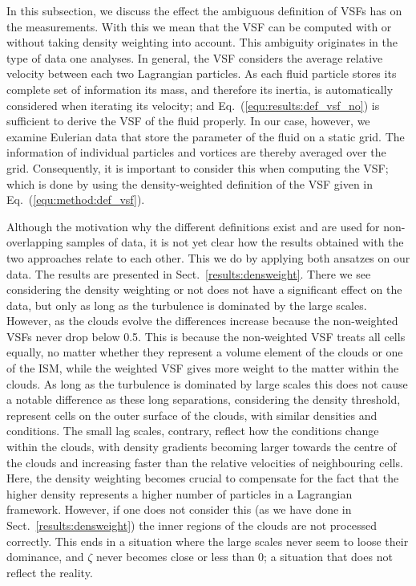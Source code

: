In this subsection, we discuss the effect the ambiguous definition of VSFs has on the measurements. 
With this we mean that the VSF can be computed with or without taking density weighting into account.
This ambiguity originates in the type of data one analyses.
In general, the VSF considers the average relative velocity between each two Lagrangian particles.
As each fluid particle stores its complete set of information its mass, and therefore its inertia, is automatically considered when iterating its velocity; and Eq.~(\ref{equ:results:def_vsf_no}) is sufficient to derive the VSF of the fluid properly.
In our case, however, we examine Eulerian data that store the parameter of the fluid on a static grid. 
The information of individual particles and vortices are thereby averaged over the grid.
Consequently, it is important to consider this when computing the VSF; which is done by using the density-weighted definition of the VSF given in Eq.~(\ref{equ:method:def_vsf}).

Although the motivation why the different definitions exist and are used for non-overlapping samples of data, it is not yet clear how the results obtained with the two approaches relate to each other. 
This we do by applying both ansatzes on our data.
The results are presented in Sect.~\ref{results:densweight}.
There we see considering the density weighting or not does not have a significant effect on the data, but only as long as the turbulence is dominated by the large scales. 
However, as the clouds evolve the differences increase because the non-weighted VSFs never drop below 0.5.
This is because the non-weighted VSF treats all cells equally, no matter whether they represent a volume element of the clouds or one of the ISM, while the weighted VSF gives more weight to the matter within the clouds.
As long as the turbulence is dominated by large scales this does not cause a notable difference as these long separations, considering the density threshold, represent cells on the outer surface of the clouds, with similar densities and conditions.
The small lag scales, contrary, reflect how the conditions change within the clouds, with density gradients becoming larger towards the centre of the clouds and increasing faster than the relative velocities of neighbouring cells.
Here, the density weighting becomes crucial to compensate for the fact that the higher density represents a higher number of particles in a Lagrangian framework.
However, if one does not consider this (as we have done in Sect.~\ref{results:densweight}) the inner regions of the clouds are not processed correctly.
This ends in a situation where the large scales never seem to loose their dominance, and $\zeta$ never becomes close or less than 0; a situation that does not reflect the reality.

